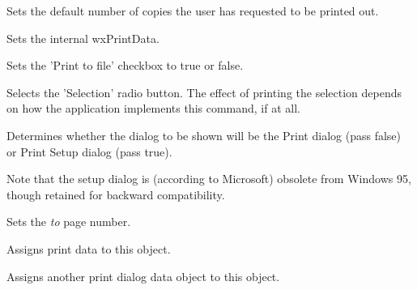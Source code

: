 Sets the default number of copies the user has requested to be printed out.

\label{wxprintdialogdatasetprintdata}


Sets the internal wxPrintData.

\label{wxprintdialogdatasetprinttofile}


Sets the 'Print to file' checkbox to true or false.

\label{wxprintdialogdatasetselection}


Selects the 'Selection' radio button. The effect of printing the selection depends on how the application
implements this command, if at all.

\label{wxprintdialogdatasetsetupdialog}


Determines whether the dialog to be shown will be the Print dialog
(pass false) or Print Setup dialog (pass true).

Note that the setup dialog is (according to Microsoft) obsolete from
Windows 95, though retained for backward compatibility.

\label{wxprintdialogdatasettopage}


Sets the {\it to} page number.

\label{wxprintdialogdataassign}


Assigns print data to this object.


Assigns another print dialog data object to this object.

\section{}\label{wxprinter}

